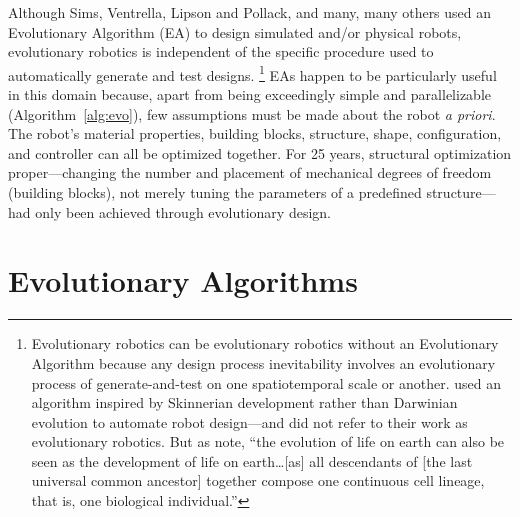 Although Sims, Ventrella, Lipson and Pollack, and many, many others \cite{ventrella1998designing,lichtensteiger1999evolving,ray2001aesthetically,bongard2003evolving,hornby2002creating,komosinski2001comparison,komosinski2003framsticks,hotz2004asymmetric,vaughan2004evolution,paul2006design,shim2006evolving,bongard2006resilient,chaumont2007evolving,bongard2010utility,auerbach2010evolving,auerbach2010dynamic,lehman2011evolving,hiller2012automatic,cheney2013unshackling,cheney2014electro,lessin2013open,auerbach2014environmental,cheney2015tight,brodbeck2015morphological,lessin2015soft,cellucci20171d,cheney2018scalable,rosser2019sim2real} used an Evolutionary Algorithm (EA) to design simulated and/or physical robots,
evolutionary robotics is independent of the specific procedure used to automatically generate and test designs.%
\footnote{%
Evolutionary robotics can be evolutionary robotics without an Evolutionary Algorithm because
any design process inevitability involves an evolutionary process of generate-and-test \cite{dennett1975law} on one spatiotemporal scale or another.
\citet{pathak2019learning} used an algorithm inspired by Skinnerian development rather than Darwinian evolution to automate robot design---and did not refer to their work as evolutionary robotics.
But as \citet{fields2020scale} note, ``the evolution of life on earth can also be seen
as the development of life on earth\dots [as]
all descendants of [the last universal common ancestor]
together compose one continuous cell lineage, that is, one biological individual.''
}
EAs happen to be particularly useful in this domain because, apart from being exceedingly simple and parallelizable (Algorithm~\ref{alg:evo}),
few assumptions must be made about the robot \textit{a priori}.
The robot's material properties, building blocks, structure, shape, configuration, and controller can all be optimized together.
For 25 years, structural optimization proper---changing the number and placement of mechanical degrees of freedom (building blocks), not merely tuning the parameters of a predefined structure---had only been achieved through evolutionary design.



\section{Evolutionary Algorithms}

